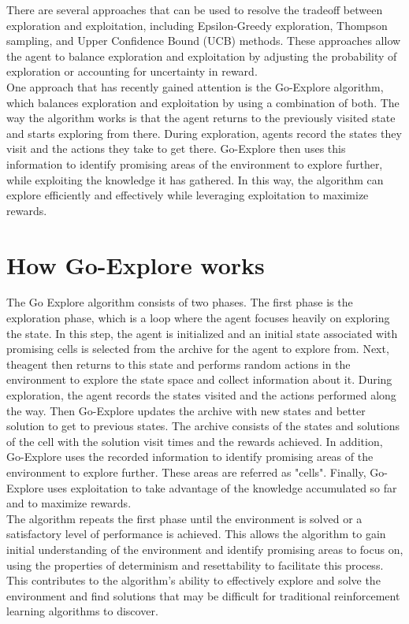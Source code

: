 \documentclass[runningheads]{llncs}%
\begin{document}
There are several approaches that can be used to resolve the tradeoff between exploration and exploitation, including Epsilon-Greedy exploration, Thompson sampling, and Upper Confidence Bound (UCB) methods. These approaches allow the agent to balance exploration and exploitation by adjusting the probability of exploration or accounting for uncertainty in reward.\\
One approach that has recently gained attention is the Go-Explore algorithm, which balances exploration and exploitation by using a combination of both. The way the algorithm works is that the agent returns to the previously visited state and starts exploring from there. During exploration, agents record the states they visit and the actions they take to get there. Go-Explore then uses this information to identify promising areas of the environment to explore further, while exploiting the knowledge it has gathered. In this way, the algorithm can explore efficiently and effectively while leveraging exploitation to maximize rewards.

\section{How Go-Explore works}

The Go Explore algorithm consists of two phases. The first phase is the exploration phase, which is a loop where the agent focuses heavily on exploring the state. In this step, the agent is initialized and an initial state associated with promising cells is selected from the archive for the agent to explore from. Next, theagent then returns to this state and performs random actions in the environment to explore the state space and collect information about it. During exploration, the agent records the states visited and the actions performed along the way. Then Go-Explore updates the archive with new states and better solution to get to previous states. The archive consists of the states and solutions of the cell with the solution visit times and the rewards achieved. In addition, Go-Explore uses the recorded information to identify promising areas of the environment to explore further. These areas are referred as "cells". Finally, Go-Explore uses exploitation to take advantage of the knowledge accumulated so far and to maximize rewards.\\ 

The algorithm repeats the first phase until the environment is solved or a satisfactory level of performance is achieved. This allows the algorithm to gain initial understanding of the environment and identify promising areas to focus on, using the properties of determinism and resettability to facilitate this process. This contributes to the algorithm's ability to effectively explore and solve the environment and find solutions that may be difficult for traditional reinforcement learning algorithms to discover. \\
\end{document}
